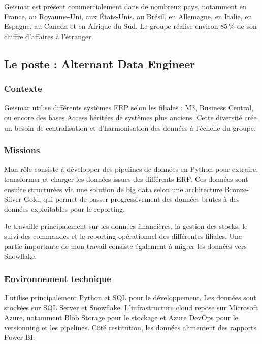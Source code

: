\documentclass{article}
\begin{document}
Geismar est présent commercialement dans de nombreux pays, notamment en France, au
Royaume-Uni, aux États-Unis, au Brésil, en Allemagne, en Italie, en Espagne, au
Canada et en Afrique du Sud. Le groupe réalise environ 85\,\% de son chiffre
d'affaires à l'étranger.

\subsection{Le poste : Alternant Data Engineer}

\subsubsection{Contexte}

Geismar utilise différents systèmes ERP selon les filiales : M3, Business Central,
ou encore des bases Access héritées de systèmes plus anciens. Cette diversité crée un
besoin de centralisation et d'harmonisation des données à l'échelle du groupe.

\subsubsection{Missions}

Mon rôle consiste à développer des pipelines de données en Python pour extraire,
transformer et charger les données issues des différents ERP. Ces données sont
ensuite structurées via une solution de big data selon une architecture
Bronze-Silver-Gold, qui permet de passer progressivement des données brutes à des
données exploitables pour le reporting.

Je travaille principalement sur les données financières, la gestion des stocks, le
suivi des commandes et le reporting opérationnel des différentes filiales. Une partie
importante de mon travail consiste également à migrer les données vers Snowflake.

\subsubsection{Environnement technique}

J'utilise principalement Python et SQL pour le développement. Les données sont
stockées sur SQL Server et Snowflake. L'infrastructure cloud repose sur Microsoft
Azure, notamment Blob Storage pour le stockage et Azure DevOps pour le versionning et
les pipelines. Côté restitution, les données alimentent des rapports Power BI.

\newpage
\end{document}
